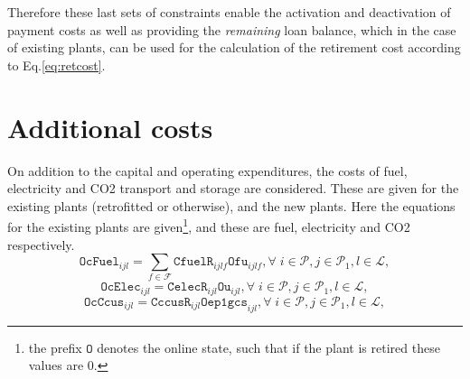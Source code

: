 \documentclass{amsart}
\begin{document}
Therefore these last sets of constraints enable the activation and deactivation
of payment costs as well as providing the \emph{remaining} loan balance, which
in the case of existing plants, can be used for the calculation of the
retirement cost according to Eq.\eqref{eq:retcost}.
%
\section{Additional costs}
%
%
On addition to the capital and operating expenditures, the costs of fuel,
electricity and CO2 transport and storage are considered. These are given for
the existing plants (retrofitted or otherwise), and the new plants.
Here the equations for the existing plants are given\footnote{the prefix
$\mathtt{O}$ denotes the online state, such that if the plant is retired these
values are 0.}, and these are fuel, electricity and CO2 respectively.
%
\begin{equation}
    \mathtt{OcFuel}_{ijl} = \sum_{f \in \mathcal{F}} 
    \mathtt{CfuelR}_{ijlf} \mathtt{Ofu}_{ijlf},
    \forall \; i \in \mathcal{P},j \in \mathcal{P}_1 ,
    l \in \mathcal{L},
\end{equation}
%
\begin{equation}
    \mathtt{OcElec}_{ijl} = \mathtt{CelecR}_{ijl} \mathtt{Ou}_{ijl},
    \forall \; i \in \mathcal{P},j \in \mathcal{P}_1 , l \in \mathcal{L},
\end{equation}
%
\begin{equation}
    \mathtt{OcCcus}_{ijl} = \mathtt{CccusR}_{ijl} \mathtt{Oep1gcs}_{ijl},
    \forall \; i \in \mathcal{P},j \in \mathcal{P}_1 , l \in \mathcal{L},
\end{equation}
%
\end{document}
